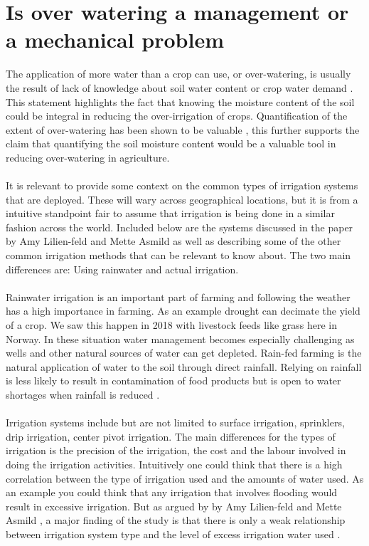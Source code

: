 \documentclass[]{uiophd}
\begin{document}
\section{Is over watering a management or a mechanical problem}
 The application of more water than a crop can use, or over-watering, is usually the result of lack of knowledge about soil water content or crop water demand \cite{LILIENFELD200773}. This statement highlights the fact that knowing the moisture content of the soil could be integral in reducing the over-irrigation of crops. Quantification of the extent of over-watering has been shown to be valuable \cite{LILIENFELD200773}, this further supports the claim that quantifying the soil moisture content would be a valuable tool in reducing over-watering in agriculture. 
\\\\
It is relevant to provide some context on the common types of irrigation systems that are deployed. These will wary across geographical locations, but it is from a intuitive standpoint fair to assume that irrigation is being done in a similar fashion across the world. Included below are the systems discussed in the paper by Amy Lilien-feld and Mette Asmild \cite{LILIENFELD200773} as well as describing some of the  other common irrigation methods that can be relevant to know about. The two main differences are: Using rainwater and actual irrigation. 
\\\\
Rainwater irrigation is an important part of farming and following the weather has a high importance in farming. As an example drought can decimate the yield of a crop. We saw this happen in 2018 with livestock feeds like grass here in Norway. In these situation water management becomes especially challenging as wells and other natural sources of water can get depleted. Rain-fed farming is the natural application of water to the soil through direct rainfall. Relying on rainfall is less likely to result in contamination of food products but is open to water shortages when rainfall is reduced \cite{cdc}.
\\\\
Irrigation systems include but are not limited to surface irrigation, sprinklers, drip irrigation, center pivot irrigation. The main differences for the types of irrigation is the precision of the irrigation, the cost and the labour involved in doing the irrigation activities. Intuitively one could think that there is a high correlation between the type of irrigation used and the amounts of water used. As an example you could think that any irrigation that involves flooding would result in excessive irrigation. But as argued by by Amy Lilien-feld and Mette Asmild \cite{LILIENFELD200773}, a major finding of the study is that there is only a weak relationship between irrigation system type and the level of excess irrigation water used \cite{LILIENFELD200773}.
\end{document}
